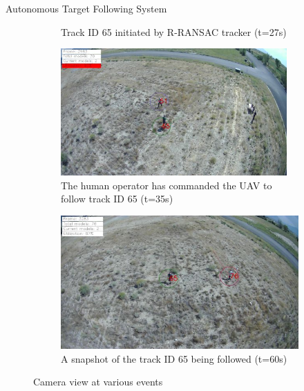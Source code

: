 \documentclass[9pt]{beamer}
\begin{document}
\begin{frame}{Autonomous Target Following System}
\begin{figure}[htbp]
\begin{subfigure}{0.3\linewidth}
		\caption{Track ID 65 initiated by R-RANSAC tracker (t=27s)}
		\label{camera3}
	\end{subfigure}
	\begin{subfigure}{0.3\linewidth}
		\centering
		\includegraphics[width=0.95\textwidth]{chapter3/ID65_follow_begin.png}
		\caption{The human operator has commanded the UAV to follow track ID 65 (t=35s)}
		\label{camera4}
	\end{subfigure}
	\centering
	\begin{subfigure}{0.3\linewidth}
		\centering
		\includegraphics[width=\textwidth]{chapter3/ID65_following.png}
		\caption{A snapshot of the track ID 65 being followed (t=60s)}
		\label{camera5}
	\end{subfigure}
	\caption{Camera view at various events}
	\label{camera}
\end{figure}	
\end{frame}
\end{document}
